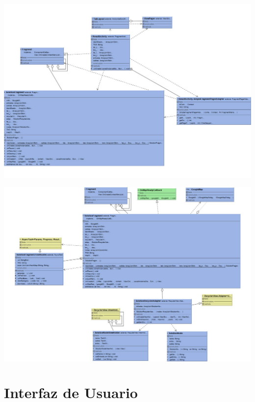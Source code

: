 \thispagestyle{empty}
{%
	\label{fig:result_activity_diagram}
	\centering
	\includegraphics[scale=.95,angle=90]{imagenes/result_activity.pdf}
	\par
}
\restoregeometry

\thispagestyle{empty}
{%
	\label{fig:solution_recycler_diagram}
	\centering
	\includegraphics[scale=.95,angle=90]{imagenes/result_fragment.pdf}
	\par
}
\restoregeometry

\section[Interfaz de Usuario]{Interfaz de Usuario}

